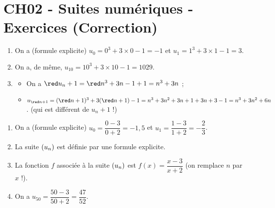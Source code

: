 \documentclass[a4paper,11pt]{article}
\author{Pierquet}
\title{\nomfichier}
\begin{document}
\pagestyle{fancy}

\part{CH02 - Suites numériques - Exercices (Correction)}

\smallskip


\begin{enumerate}[itemsep=0pt]
	\item On a (formule explicite) $u_0=0^3+3 \times 0 -1 = -1$ et $u_1=1^3+3\times1-1=3$.
	\item On a, de même, $u_{10}=10^3+3\times10-1=\num{1029}$.
	\item \begin{itemize}[leftmargin=*]
		\item On a ${\red u_n} + 1 = {\red n^3+3n-1}+1=n^3+3n$ ;
		\item $u_{\red n+1}=({\red n+1})^3+3({\red n+1})-1=n^3+3n^2+3n+1+3n+3-1=n^3+3n^2+6n$. (qui est différent de $u_n + 1$ !)
	\end{itemize}
\end{enumerate}

\medskip


\begin{enumerate}[itemsep=0pt]
	\item On a (formule explicite) $u_0=\dfrac{0-3}{0+2}=-1,5$ et $u_1=\dfrac{1-3}{1+2}=-\dfrac{2}{3}$.
	\item La suite $\left( u_n \right)$ est définie par une formule explicite.
	\item La fonction $f$ associée à la suite $\left( u_n \right)$ est $f(x)=\dfrac{x-3}{x+2}$ (on remplace $n$ par $x$ !).
	\item On a $u_{50}=\dfrac{50-3}{50+2}=\dfrac{47}{52}$.
\end{enumerate}

\medskip

\end{document}
